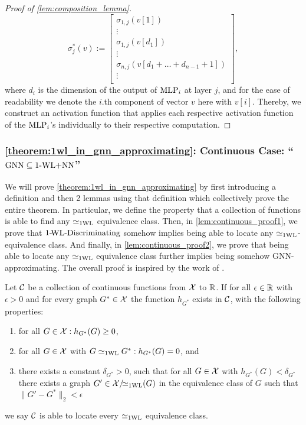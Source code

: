 \begin{proof}[Proof of \cref{lem:composition_lemma}]
\begin{equation*}
        \sigma^*_j(v) := \begin{bmatrix}
            \sigma_{1,j}(v[1])\\
            \vdots\\
            \sigma_{1,j}(v[d_1])\\
            \vdots\\
            \sigma_{n,j}(v[d_1 + \dots + d_{n-1} + 1])\\
            \vdots\\
        \end{bmatrix},
    \end{equation*}
    where $d_i$ is the dimension of the output of $\text{MLP}_i$ at layer $j$, and for the ease of readability we denote the $i$.th component of vector $v$ here with $v[i]$. Thereby, we construct an activation function that applies each respective activation function of the $\text{MLP}_i$'s individually to their respective computation.
\end{proof}


\subsubsection{\autoref{theorem:1wl_in_gnn_approximating}: Continuous Case: ``$\text{GNN} \subseteq \text{1-WL+NN}$''}\label{app:gnn_in_wlnn}
We will prove \autoref{theorem:1wl_in_gnn_approximating} by first introducing a definition and then 2 lemmas using that definition which collectively prove the entire theorem. In particular, we define the property that a collection of functions is able to find any $\simeq_{\text{1WL}}$ equivalence class. Then, in \autoref{lem:continuous_proof1}, we prove that $\text{1-\!WL-Discriminating}$ somehow implies being able to locate any $\simeq_{\text{1WL}}$-equivalence class. And finally, in \autoref{lem:continuous_proof2}, we prove that being able to locate any $\simeq_{\text{1WL}}$ equivalence class further implies being somehow GNN-approximating. The overall proof is inspired by the work of \cite{Chen2019}.

\begin{definition}
    Let $\mathcal{C}$ be a collection of continuous functions from $\mathcal{X}$ to $\mathbb{R}$. If for all $\epsilon \in \mathbb{R}$ with $\epsilon > 0$ and for every graph $G^* \in \mathcal{X}$ the function $h_{G^*}$ exists in $\mathcal{C}$, with the following properties:
    \begin{enumerate}
        \item for all $G \in \mathcal{X}:  h_{G^*}(G) \geq 0$,
        \item for all $G \in \mathcal{X}$ with $G \simeq_{\text{1WL}} G^*: h_{G^*}(G)=0$, and
        \item there exists a constant $\delta_{G^*} > 0$, such that for all $G \in \mathcal{X}$ with $h_{G^*}(G) < \delta_{G^*}$ there exists a graph $G' \in \mathcal{X}/\!{\simeq_{\text{1WL}}}(G)$ in the equivalence class of $G$ such that $\| G' - G^* \|_2 < \epsilon$
    \end{enumerate}
    we say $\mathcal{C}$ is able to locate every $\simeq_{\text{1WL}}$ equivalence class.
\end{definition}

